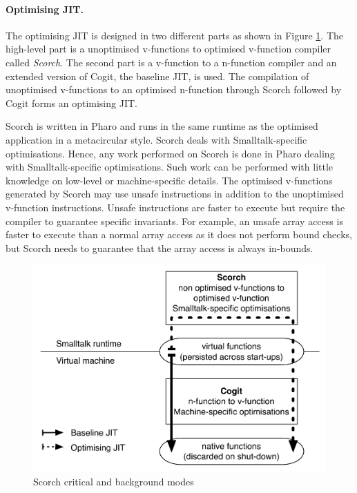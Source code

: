 \documentclass[a4paper,12pt,twoside]{../includes/ThesisStyle}
\begin{document}
\paragraph{Optimising JIT.}
The optimising JIT is designed in two different parts as shown in Figure \ref{fig:OptArchitecture}. The high-level part is a unoptimised v-functions to optimised v-function compiler called \emph{Scorch}. The second part is a v-function to a n-function compiler and an extended version of Cogit, the baseline JIT, is used. The compilation of unoptimised v-functions to an optimised n-function through Scorch followed by Cogit forms an optimising JIT.

Scorch is written in Pharo and runs in the same runtime as the optimised application in a metacircular style. Scorch deals with Smalltalk-specific optimisations. Hence, any work performed on Scorch is done in Pharo dealing with Smalltalk-specific optimisations. Such work can be performed with little knowledge on low-level or machine-specific details. The optimised v-functions generated by Scorch may use unsafe instructions in addition to the unoptimised v-function instructions. Unsafe instructions are faster to execute but require the compiler to guarantee specific invariants. For example, an unsafe array access is faster to execute than a normal array access as it does not perform bound checks, but Scorch needs to guarantee that the array access is always in-bounds.

\begin{figure}[h!]
    \begin{center}
        \includegraphics[width=0.8\linewidth]{OptArchitecture}
        \caption{Scorch critical and background modes}
        \label{fig:OptArchitecture}
    \end{center}
\end{figure}
\end{document}
